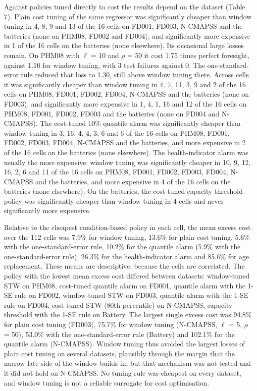 \documentclass[a4paper,fleqn,doubleblind]{cas-dc}
\begin{document}
Against policies tuned directly to cost the results depend on the dataset (Table 7). Plain cost tuning of the same regressor was significantly cheaper than window tuning in 4, 8, 9 and 13 of the 16 cells on FD001, FD003, N-CMAPSS and the batteries (none on PHM08, FD002 and FD004), and significantly more expensive in 1 of the 16 cells on the batteries (none elsewhere). Its occasional large losses remain. On PHM08 with $\ell$ = 10 and $\rho$ = 50 it cost 1.75 times perfect foresight, against 1.10 for window tuning, with 3 test failures against 0. The one-standard-error rule reduced that loss to 1.30, still above window tuning there. Across cells it was significantly cheaper than window tuning in 4, 7, 11, 3, 9 and 2 of the 16 cells on PHM08, FD001, FD002, FD004, N-CMAPSS and the batteries (none on FD003), and significantly more expensive in 1, 4, 1, 16 and 12 of the 16 cells on PHM08, FD001, FD002, FD003 and the batteries (none on FD004 and N-CMAPSS). The cost-tuned 10\% quantile alarm was significantly cheaper than window tuning in 3, 16, 4, 4, 3, 6 and 6 of the 16 cells on PHM08, FD001, FD002, FD003, FD004, N-CMAPSS and the batteries, and more expensive in 2 of the 16 cells on the batteries (none elsewhere). The health-indicator alarm was usually the more expensive: window tuning was significantly cheaper in 10, 9, 12, 16, 2, 6 and 11 of the 16 cells on PHM08, FD001, FD002, FD003, FD004, N-CMAPSS and the batteries, and more expensive in 4 of the 16 cells on the batteries (none elsewhere). On the batteries, the cost-tuned capacity-threshold policy was significantly cheaper than window tuning in 4 cells and never significantly more expensive.

Relative to the cheapest condition-based policy in each cell, the mean excess cost over the 112 cells was 7.9\% for window tuning, 13.6\% for plain cost tuning, 5.6\% with the one-standard-error rule, 10.2\% for the quantile alarm (5.9\% with the one-standard-error rule), 26.3\% for the health-indicator alarm and 85.6\% for age replacement. These means are descriptive, because the cells are correlated. The policy with the lowest mean excess cost differed between datasets: window-tuned STW on PHM08, cost-tuned quantile alarm on FD001, quantile alarm with the 1-SE rule on FD002, window-tuned STW on FD003, quantile alarm with the 1-SE rule on FD004, cost-tuned STW (80th percentile) on N-CMAPSS, capacity threshold with the 1-SE rule on Battery. The largest single excess cost was 94.8\% for plain cost tuning (FD003), 75.7\% for window tuning (N-CMAPSS, $\ell$ = 5, $\rho$ = 50), 53.0\% with the one-standard-error rule (Battery) and 102.1\% for the quantile alarm (N-CMAPSS). Window tuning thus avoided the largest losses of plain cost tuning on several datasets, plausibly through the margin that the narrow late side of the window builds in, but that mechanism was not tested and it did not hold on N-CMAPSS. No tuning rule was cheapest on every dataset, and window tuning is not a reliable surrogate for cost optimisation.
\end{document}
